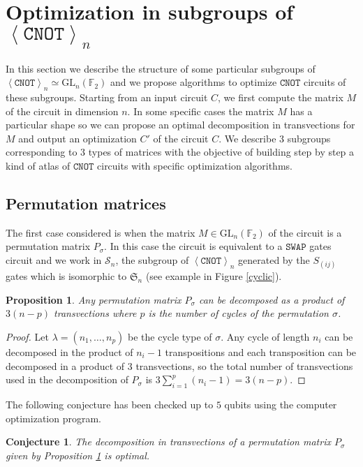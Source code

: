 \documentclass[a4paper,12pt,fleqn]{article}
\newcommand\swap{\mathtt{SWAP}}
\newcommand\cnot{\mathtt{CNOT}}
\newcommand\SYM[1][n]{\mathfrak{S}_{#1}}
\newcommand\XG[1][n]{\left<\cnot\right>_{#1}}
\newcommand\GL[1][n]{\mathrm{GL}_{#1}(\mathbb{F}_2)}
\newcommand\SG[1][n]{\mathcal{S}_{#1}}
\newtheorem{prop}[theo]{Proposition}
\newtheorem{conj}[theo]{Conjecture}
\begin{document}
\section{Optimization in subgroups of $\XG$}\label{subgroups}
In this section we describe the structure of some particular subgroups of $\XG\simeq \GL$ and we propose algorithms to optimize $\cnot$ circuits of these subgroups. Starting from an input circuit $C$, we first compute the matrix $M$ of the circuit in dimension $n$. In some specific cases the matrix $M$ has a particular shape so we can propose an optimal decomposition  in transvections for $M$ and output an optimization $C'$ of the circuit $C$. We describe  3 subgroups corresponding to 3 types of matrices with the objective of building step by step a kind of atlas of $\cnot$ circuits with specific optimization algorithms.
\subsection{Permutation matrices}
The first case considered is when the matrix $M\in\GL$ of the circuit is a permutation  matrix $P_{\sigma}$. In this case the circuit is equivalent to a $\swap$ gates circuit and we work in  $\SG$, the subgroup of $\XG$ generated by the $S_{(ij)}$ gates which is isomorphic to $\SYM$ (see example in Figure \ref{cyclic}).

\begin{prop}\label{sigmadecompo}
Any permutation matrix $P_{\sigma}$ can be decomposed as a product of $3(n-p)$ transvections where $p$ is the number of cycles of the permutation $\sigma$.
  \end{prop}
  \begin{proof}Let $\lambda=(n_1,\dots,n_p)$ be the cycle type of $\sigma$. 
     Any cycle of length $n_i$ can be decomposed in the product of $n_{i}-1$ transpositions and each transposition can be decomposed in a product of 3 transvections, so the total number of transvections used in the decomposition of $P_{\sigma}$ is $3\sum_{i=1}^{p}(n_i-1)=3(n-p)$. 
  \end{proof}

  The following conjecture has been checked up to $5$ qubits using the computer optimization program.

  \begin{conj}\label{sigmaconj}
The decomposition in transvections of a permutation matrix $P_{\sigma}$ given by Proposition \ref{sigmadecompo} is optimal.
    \end{conj}
\end{document}
